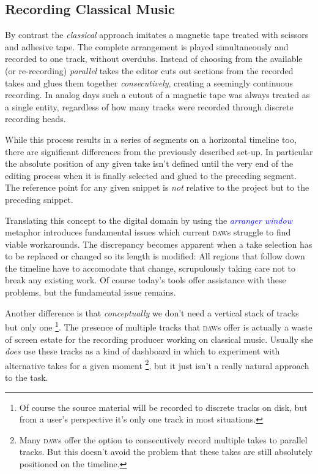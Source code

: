 \documentclass[11pt,a4paper]{article}
\newcommand*{\term}[1]{\textcolor{blue}{\emph{#1}}}
\begin{document}
\subsection{Recording Classical Music}
 
By contrast the \emph{classical} approach imitates a magnetic tape
treated with scissors and adhesive tape.
The complete arrangement is played simultaneously and recorded to one track,
without overdubs.
Instead of choosing from the available (or re-recording) \emph{parallel} takes
the editor cuts out sections from the recorded takes and glues them together
\emph{consecutively}, creating a seemingly continuous recording.
In analog days such a cutout of a magnetic tape was always treated as a single entity,
regardless of how many tracks were recorded through discrete recording heads.

While this process results in a series of segments on a horizontal timeline too,
there are significant differences from the previously described set-up.
In particular the absolute position of any given take isn't defined until the
very end of the editing process when it is finally selected and glued to the
preceding segment.
The reference point for any given snippet is \emph{not} relative to the project
but to the preceding snippet.

Translating this concept to the digital domain by using the \term{arranger window}
metaphor introduces fundamental issues which current \textsc{daw}s struggle to find
viable workarounds.
The discrepancy becomes apparent when a take selection has to be replaced or changed
so its length is modified: All regions that follow down the timeline have
to accomodate that change, scrupulously taking care not to break any existing work.
Of course today's tools offer assistance with these problems, but the fundamental
issue remains.

Another difference is that \emph{conceptually} we don't need a vertical stack of
tracks but only one%
\footnote{Of course the source material will be recorded to discrete tracks on
disk, but from a user's perspective it's only one track in most situations.}.
The presence of multiple tracks that \textsc{daw}s offer is actually a waste of
screen estate for the recording producer working on classical music.
Usually she \emph{does} use these tracks as a kind of dashboard in which to
experiment with alternative takes for a given moment%
\footnote{Many \textsc{daw}s offer the option to consecutively record multiple
takes to parallel tracks. But this doesn't avoid the problem that these takes
are still absolutely positioned on the timeline.}, but it just isn't a really
natural approach to the task.
\end{document}
